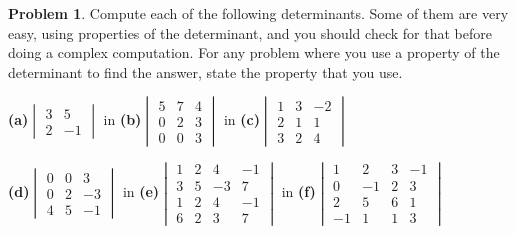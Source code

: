 \documentclass[11pt]{article}
\theoremstyle{definition}
\newtheorem{problem}{Problem}
\newenvironment{answer}{\par\bigskip\bgroup\color{darkblue}}{\egroup}
\begin{document}
\begin{answer}
\end{answer}




\begin{problem}
Compute each of the following determinants.  Some of them are very easy, using properties of
the determinant, and you should check for that before doing a complex computation.
For any problem where you use a property of the determinant to find the
answer, state the property that you use.

\bigskip
\centerline{
   \textbf{(a)}\quad $\begin{vmatrix} 3 & 5 \\ 2 & -1 \end{vmatrix}$  in
   \textbf{(b)}\quad $\begin{vmatrix} 5 & 7 & 4 \\ 0 & 2 & 3 \\ 0 & 0 & 3 \end{vmatrix}$  in
   \textbf{(c)}\quad $\begin{vmatrix} 1 & 3 & -2 \\ 2 & 1 & 1 \\ 3 & 2 & 4 \end{vmatrix}$
}

\bigskip
\centerline{
   \textbf{(d)}\quad $\begin{vmatrix} 0 & 0 & 3 \\  0 & 2 & -3 \\ 4 & 5 & -1 \end{vmatrix}$  in
   \textbf{(e)}\quad $\begin{vmatrix} 1 & 2 & 4 & -1 \\ 3 & 5 & -3 & 7 \\
                                      1 & 2 & 4 & -1 \\ 6 & 2 & 3 & 7 \end{vmatrix}$  in
   \textbf{(f)}\quad $\begin{vmatrix} 1 & 2 & 3 & -1 \\ 0 & -1 & 2 & 3 \\
                                      2 & 5 & 6 & 1 \\ -1 & 1& 1 & 3 \end{vmatrix}$
}

\end{problem}

\begin{answer}
\end{answer}
\end{document}
